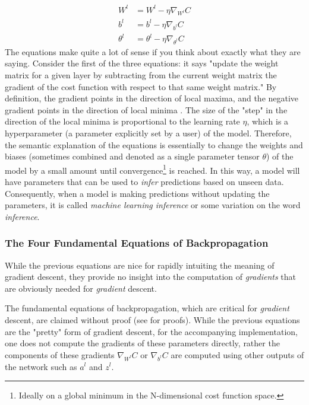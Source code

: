 \documentclass{article}
\begin{document}
\begin{align}
	W^{l}      & = W^{l} - \eta \nabla_{W^{l}}C           \\
	b^{l}      & = b^{l} - \eta \nabla_{b^{l}}C           \\
	\theta^{l} & = \theta^{l} - \eta \nabla_{\theta^{l}}C
\end{align}
The equations make quite a lot of sense if you think about exactly
what they are saying. Consider the first of the three equations: it says "update the
weight matrix for a given layer by subtracting from the current weight matrix
the gradient of the cost function with respect to that same weight matrix." By definition,
the gradient points in the direction of local maxima, and the
negative gradient points in the direction of local minima \cite{MathLibreGradient2021}.
The size of the "step" in the direction of the local minima
is proportional to the learning rate $\eta$,
which is a hyperparameter (a parameter explicitly set by a user) of the model.
Therefore, the semantic explanation of the equations is essentially to change the
weights and biases (sometimes combined and denoted as a single parameter tensor $\theta$)
of the model by a small amount until convergence\footnote{Ideally
	on a global minimum in the N-dimensional cost function space.} is reached. In this way, a model
will have parameters that can be used to \textit{infer} predictions based on
unseen data. Consequently, when a model is making predictions without
updating the parameters, it is called \textit{machine learning inference} or
some variation on the word \textit{inference}.

\subsubsection{The Four Fundamental Equations of Backpropagation}

While the previous equations are nice for rapidly intuiting the meaning of
gradient descent, they provide no insight into the computation of \textit{gradients}
that are obviously needed for \textit{gradient} descent.

The fundamental equations of backpropagation, which are critical for \textit{gradient}
descent, are claimed without proof (see \cite{Nielsen2015} for proofs). While
the previous equations are the "pretty" form of gradient descent, for the
accompanying implementation, one does not compute the gradients of these parameters
directly, rather the components of these gradients $\nabla_{W^{l}}C$ or $\nabla_{b^{l}}C$
are computed using other outputs of the network such as $a^{l}$ and $z^{l}$.
\end{document}
